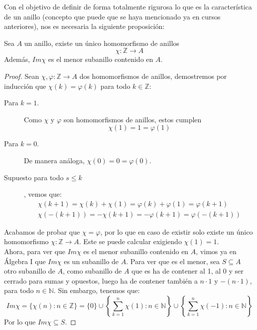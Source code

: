 \noindent
Con el objetivo de definir de forma totalmente rigurosa lo que es la característica de un anillo (concepto que puede que se haya mencionado ya en cursos anteriores), nos es necesaria la siguiente proposición:
\begin{prop}
    Sea $A$ un anillo, existe un único homomorfismo de anillos
    \begin{equation*}
        \chi:\mathbb{Z}\to A
    \end{equation*}
    Además, $Im\chi$ es el menor subanillo contenido en $A$.
    \begin{proof}
        Sean $\chi,\varphi:\mathbb{Z}\to A$ dos homomorfismos de anillos, demostremos por inducción que $\chi(k) = \varphi(k)$ para todo $k\in \mathbb{Z}$:
        \begin{description}
            \item [Para $k=1$.] Como $\chi$ y $\varphi$ son homomorfismos de anillos, estos cumplen 
                \begin{equation*}
                    \chi(1) = 1 = \varphi(1)
                \end{equation*}
            \item [Para $k=0$.] De manera análoga, $\chi(0) = 0 = \varphi(0)$.
            \item [Supuesto para todo $s\leq k$], vemos que:
                \begin{gather*}
                    \chi(k+1) = \chi(k) + \chi(1) = \varphi(k) + \varphi(1) = \varphi(k+1) \\
                    \chi(-(k+1)) = -\chi(k+1) = -\varphi(k+1) = \varphi(-(k+1))
                \end{gather*}
        \end{description}
        Acabamos de probar que $\chi = \varphi$, por lo que en caso de existir solo existe un único homomorfismo $\chi:\mathbb{Z}\to A$. Este se puede calcular exigiendo $\chi(1)= 1$.\\

        \noindent
        Ahora, para ver que $Im\chi$ es el menor subanillo contenido en $A$, vimos ya en Álgebra I que $Im\chi$ es un subanillo de $A$. Para ver que es el menor, sea $S\subseteq A$ otro subanillo de $A$, como subanillo de $A$ que es ha de contener al 1, al 0 y ser cerrado para sumas y opuestos, luego ha de contener también a $n\cdot 1$ y $-(n\cdot 1)$, para todo $n\in \mathbb{N}$. Sin embargo, tenemos que:
        \begin{equation*}
            Im\chi = \{\chi(n) : n\in \mathbb{Z}\} = \{0\}\cup \left\{\sum_{k=1}^{n}\chi(1) : n\in \mathbb{N}\right\} \cup \left\{\sum_{k=1}^{n}\chi(-1) : n\in \mathbb{N}\right\}
        \end{equation*}
         Por lo que $Im\chi \subseteq S$.
    \end{proof}
\end{prop}


